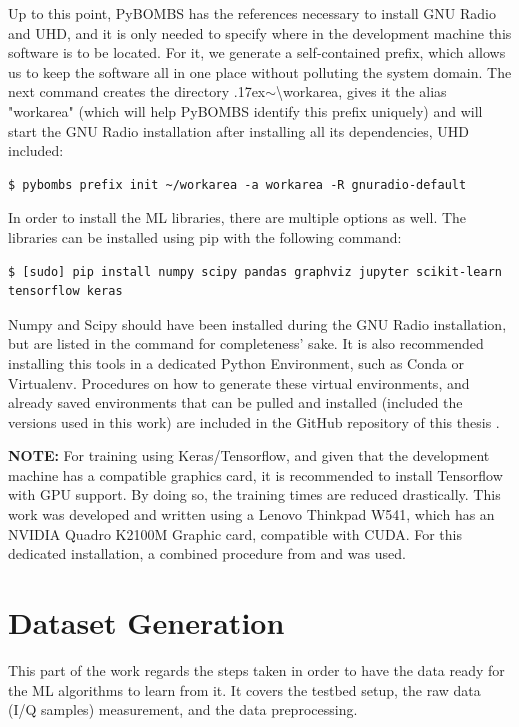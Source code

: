 Up to this point, \ac{PyBOMBS} has the references necessary to install GNU Radio and \ac{UHD}, and it is only needed to specify where in the development machine this software is to be located. For it, we generate a self-contained prefix, which allows us to keep the software all in one place without polluting the system domain. The next command creates the directory {\raise.17ex\hbox{$\scriptstyle\sim$}}\textbackslash workarea, gives it the alias "workarea" (which will help \ac{PyBOMBS} identify this prefix uniquely) and will start the GNU Radio installation after installing all its dependencies, \ac{UHD} included:

\begin{lstlisting}[breaklines=true]
    $ pybombs prefix init ~/workarea -a workarea -R gnuradio-default
\end{lstlisting}


In order to install the \ac{ML} libraries, there are multiple options as well. The libraries can be installed using pip with the following command:

\begin{lstlisting}[breaklines=true]
    $ [sudo] pip install numpy scipy pandas graphviz jupyter scikit-learn tensorflow keras
\end{lstlisting}

Numpy and Scipy should have been installed during the GNU Radio installation, but are listed in the command for completeness' sake. It is also recommended installing this tools in a dedicated Python Environment, such as Conda or Virtualenv. Procedures on how to generate these virtual environments, and already saved environments that can be pulled and installed (included the versions used in this work) are included in the GitHub repository of this thesis \cite{repo:cognitive_radio_ml}.

\textbf{NOTE:} For training using Keras/Tensorflow, and given that the development machine has a compatible graphics card, it is recommended to install Tensorflow with GPU support. By doing so, the training times are reduced drastically. This work was developed and written using a Lenovo Thinkpad W541, which has an NVIDIA Quadro K2100M Graphic card, compatible with CUDA. For this dedicated installation, a combined procedure from \cite{Yadak} and \cite{Andrews} was used.

\section{Dataset Generation}
This part of the work regards the steps taken in order to have the data ready for the \ac{ML} algorithms to learn from it. It covers the testbed setup, the raw data (I/Q samples) measurement, and the data preprocessing.
